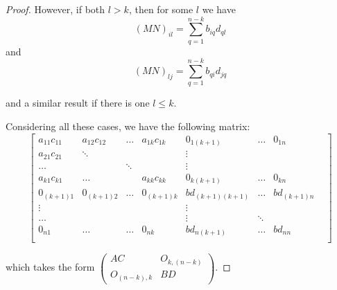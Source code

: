 \documentclass[12pt, a4paper]{article}
\begin{document}
\begin{proof}
    However, if both $l > k$, then for some $l$ we have 
    \[(MN)_{il} = \sum_{q = 1}^{n-k} b_{iq}d_{ql}\] and
    \[(MN)_{lj} = \sum_{q = 1}^{n-k} b_{qi}d_{jq}\]

    and a similar result if there is one $l \leq k$.

    \newpage
    Considering all these cases, we have the following matrix:
    \[
        \begin{bmatrix}
            a_{11}c_{11} & a_{12}c_{12} & \ldots & a_{1k}c_{1k} 
            & 0_{1(k+1)} & \ldots & 0_{1n}\\
            a_{21}c_{21} & \ddots &        &        & \vdots     &        &\\
            \ldots &        & \ddots &        & \vdots     &        &\\
            a_{k1}c_{k1} & \ldots &        & a_{kk}c_{kk} 
            & 0_{k(k+1)} & \ldots & 0_{kn}\\
            0_{(k+1)1} & 0_{(k+1)2} & \ldots & 0_{(k+1)k}
            & bd_{(k+1)(k+1)} & \ldots & bd_{(k+1)n}\\
            \vdots & &        &        & \vdots &            &        &\\
            \ldots &        &        & & \vdots & \ddots &\\
            0_{n1} & \ldots & \ldots & 0_{nk} & bd_{n(k+1)} & \ldots & bd_{nn}\\
        \end{bmatrix}
    \]

    which takes the form
    $\begin{pmatrix}AC & O_{k,(n-k)} \\ O_{(n-k),k} & BD\end{pmatrix}$.
\end{proof}
\end{document}
